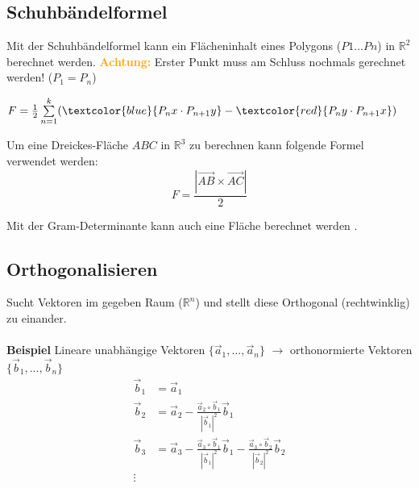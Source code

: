 \subsection{Schuhbändelformel}
Mit der Schuhbändelformel kann ein Flächeninhalt eines Polygons ($P1 \dots Pn$) in $\mathbb{R}^2$ berechnet werden. \textcolor{orange}{\textbf{Achtung:}} Erster Punkt muss am Schluss nochmals gerechnet werden! ($P_1 = P_n$)

\begin{center}
	$F = \frac{1}{2}\sum\limits_{n = 1}^{k}(\textcolor{blue}{P_{n}x \cdot P_{n+1}y } - \textcolor{red}{P_{n}y \cdot P_{n+1}x })$
	
	\tikzset{ x=1mm, y=1mm }
\end{center}

\noindent
Um eine Dreickes-Fläche $ABC$ in $\mathbb{R}^3$ zu berechnen kann folgende Formel verwendet werden:
\[F = \frac{\left|\vec{AB} \times \vec{AC}\right|}{2}\]

\noindent
Mit der Gram-Determinante kann auch eine Fläche berechnet werden .

\subsection{Orthogonalisieren}\label{orthogonalisieren}
Sucht Vektoren im gegeben Raum ($\mathbb{R}^n$) und stellt diese Orthogonal (rechtwinklig) zu einander. 
\\ \\
\textbf{Beispiel}
Lineare unabhängige Vektoren $\{\vec{a}_1, ..., \vec{a}_n\}$ $\rightarrow$ orthonormierte Vektoren $\{\vec{b}_1, ..., \vec{b}_n\}$
\begin{align*}
	\vec{b}_1 &= \vec{a}_1 \\
	\vec{b}_2 &= \vec{a}_2 - \frac{\vec{a}_2 \circ \vec{b}_1}{|\vec{b}_1|^2}\vec{b}_1\\
	\vec{b}_3 &= \vec{a}_3 - \frac{\vec{a}_3 \circ \vec{b}_1}{|\vec{b}_1|^2}\vec{b}_1 - \frac{\vec{a}_3 \circ \vec{b}_2}{|\vec{b}_2|^2}\vec{b}_2\\
	\vdots \\
\end{align*}

